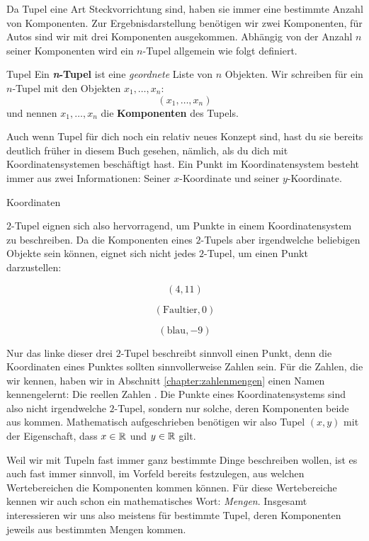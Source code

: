 \documentclass[../../main.tex]{subfiles}
\begin{document}
Da Tupel eine Art Steckvorrichtung sind, haben sie immer eine bestimmte Anzahl von Komponenten. Zur Ergebnisdarstellung benötigen wir zwei Komponenten, für Autos sind wir mit drei Komponenten ausgekommen. Abhängig von der Anzahl $n$ seiner Komponenten wird ein $n$-Tupel allgemein wie folgt definiert.

\begin{definition}{Tupel}
    Ein \textbf{\emph{n}-Tupel} ist eine \textit{geordnete} Liste von $n$ Objekten. Wir schreiben für ein $n$-Tupel mit den Objekten $x_1,\dots,x_n$:
    \[(x_1,\dots,x_n)\]
    und nennen $x_1,\dots,x_n$ die \textbf{Komponenten} des Tupels.
\end{definition}

Auch wenn Tupel für dich noch ein relativ neues Konzept sind, hast du sie bereits deutlich früher in diesem Buch gesehen, nämlich, als du dich mit Koordinatensystemen beschäftigt hast. Ein Punkt im Koordinatensystem besteht immer aus zwei Informationen: Seiner $x$-Koordinate und seiner $y$-Koordinate.

\begin{example}{}
    Koordinaten
\end{example}

$2$-Tupel eignen sich also hervorragend, um Punkte in einem Koordinatensystem zu beschreiben. Da die Komponenten eines $2$-Tupels aber irgendwelche beliebigen Objekte sein können, eignet sich nicht jedes $2$-Tupel, um einen Punkt darzustellen:
\begin{multicols}{3}
    \[(4,11)\]

    \[(\text{Faultier},0)\]

    \[(\text{blau},-9)\]
\end{multicols}
Nur das linke dieser drei $2$-Tupel beschreibt sinnvoll einen Punkt, denn die Koordinaten eines Punktes sollten sinnvollerweise Zahlen sein. Für die Zahlen, die wir kennen, haben wir in Abschnitt \ref{chapter:zahlenmengen} einen Namen kennengelernt: Die reellen Zahlen \Real. Die Punkte eines Koordinatensystems sind also nicht irgendwelche $2$-Tupel, sondern nur solche, deren Komponenten beide aus \Real kommen. Mathematisch aufgeschrieben benötigen wir also Tupel $(x,y)$ mit der Eigenschaft, dass $x\in\mathbb{R}$ und $y\in\mathbb{R}$ gilt.

Weil wir mit Tupeln fast immer ganz bestimmte Dinge beschreiben wollen, ist es auch fast immer sinnvoll, im Vorfeld bereits festzulegen, aus welchen Wertebereichen die Komponenten kommen können. Für diese Wertebereiche kennen wir auch schon ein mathematisches Wort: \emph{Mengen}. Insgesamt interessieren wir uns also meistens für bestimmte Tupel, deren Komponenten jeweils aus bestimmten Mengen kommen.
\end{document}
